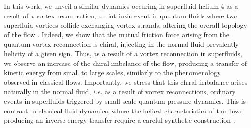 \documentclass[%
 reprint,
 amsmath,amssymb,
 aps,
 prl,
]{revtex4-2}
\begin{document}
{In this work, we unveil a similar dynamics occuring in superfluid helium-4 as a result of a vortex reconnection, an intrinsic event in quantum fluids
where two superfluid vortices collide exchanging vortex strands, altering the overall topology of the flow
\cite{koplik-levine-1993,bewley-etal-2008,rorai-etal-2016,serafini-etal-2017,galantucci-baggaley-parker-barenghi-2019,villois2020irreversible}. 
Indeed, we show that the mutual friction force arising from the quantum vortex reconnection is chiral, injecting in the normal fluid prevalently helicity of
a given sign. Thus, as a result of a vortex reconnection in superfluids, we observe an increase of the chiral imbalance of the flow, producing a transfer of
kinetic energy from small to large scales, similarly to the phenomenology observed in classical flows. Importantly, we stress that this chiral imbalance
arises naturally in the normal fluid, \textit{i.e.} as a result of vortex reconnections, ordinary events in superfluids triggered by small-scale
quantum pressure dynamics. This is contrast to classical fluid dynamics, where the helical characteristics of the flows producing 
an inverse energy transfer require a careful synthetic construction 
\cite{biferaleInverseEnergyCascade2012a,biferale-etal-2013,sahoo-etal-2017,plunianInverseCascadeEnergy2020a}.

%



}
\end{document}
